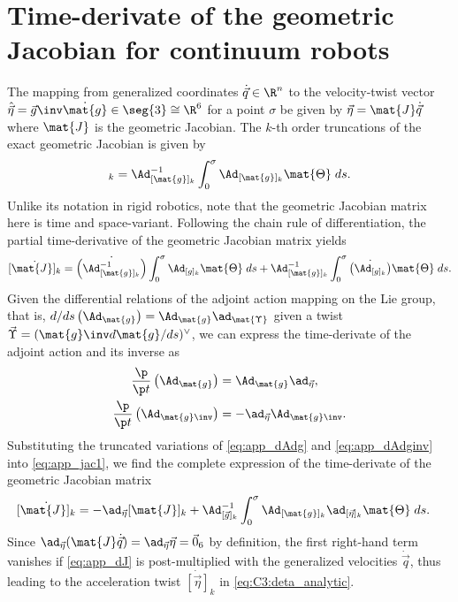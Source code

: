 \section{Time-derivate of the geometric Jacobian for continuum robots} 
\label{app:C3:jacobian}
The mapping from generalized coordinates $\dot{\vec{q}} \in \R^n$ to the velocity-twist vector $\hat{\vec{\eta}} = \vec{g}\inv \dot{\mat{g}} \in \seg{3} \cong \R^6$ for a point $\sigma$ be given by $\vec{\eta}= \mat{J}\dot{\vec{q}}$ where $\mat{J}$ is the geometric Jacobian. The $k$-th order truncations of the exact geometric Jacobian is given by
%
\begin{equation}
[\mat{J}]_k = \Ad_{{[\mat{g}]_k}}^{-1} \int_0^\sigma \Ad_{[\mat{g}]_k} \mat{\Theta} \; ds. \label{eq:app_jac0}
\end{equation}
Unlike its notation in rigid robotics, note that the geometric Jacobian matrix here is time and space-variant. Following the chain rule of differentiation, the partial time-derivative of the geometric Jacobian matrix yields
%
\begin{equation}
\dot{[\mat{J}]_k} = \dot{\left(\Ad_{{[\mat{g}]_k}}^{-1}\right)} \int_0^\sigma \Ad_{[g]_k} \mat{\Theta} \; ds + \Ad_{{[\mat{g}]_k}}^{-1} \int_0^\sigma \dot{\left(\Ad_{[g]_k}\right)} \mat{\Theta} \; ds. \label{eq:app_jac1}
\end{equation}
%
Given the differential relations of the adjoint action mapping on the Lie group, that is, ${d/ds}\left(\Ad_{\mat{g}} \right) = \Ad_{\mat{g}} \ad_{\mat{\Upsilon}}$ given a twist $\vec{\Upsilon} = (\mat{g}\inv d\mat{g}/ds)^\vee$, we can express the time-derivate of the adjoint action and its inverse as
%
\begin{align}
\frac{\p}{\p t}\left(\Ad_{\mat{g}} \right) & = \Ad_{\mat{g}} \ad_{\vec{\eta}}, \label{eq:app_dAdg}\\
\frac{\p}{\p t}\left(\Ad_{\mat{g}\inv} \right) & = -\ad_{\vec{\eta}}\Ad_{\mat{g}\inv}. \label{eq:app_dAdginv}
\end{align}
%
Substituting the truncated variations of \eqref{eq:app_dAdg} and \eqref{eq:app_dAdginv} into \eqref{eq:app_jac1}, we find the complete expression of the time-derivate of the geometric Jacobian matrix
%
\begin{align}
\dot{[\mat{J}]_k} & = -\ad_{\vec{\eta}} {[\mat{J}]_k} + \Ad_{{[\vec{g}]_k}}^{-1} \int_0^\sigma \Ad_{{[\mat{g}]_k}} \ad_{[\vec{\eta}]_k} \mat{\Theta}\; ds. \label{eq:app_dJ}
\end{align}
%
Since $\ad_{\vec{\eta}} (\mat{J} \dot{\vec{q}}) = \ad_{\vec{\eta}} \vec{\eta} = \vec{0}_6$ by definition, the first right-hand term vanishes if \eqref{eq:app_dJ} is post-multiplied with the generalized velocities $\dot{\vec{q}}$, thus leading to the acceleration twist $\dot{[\vec{\eta}]}_k$ in \eqref{eq:C3:deta_analytic}.
